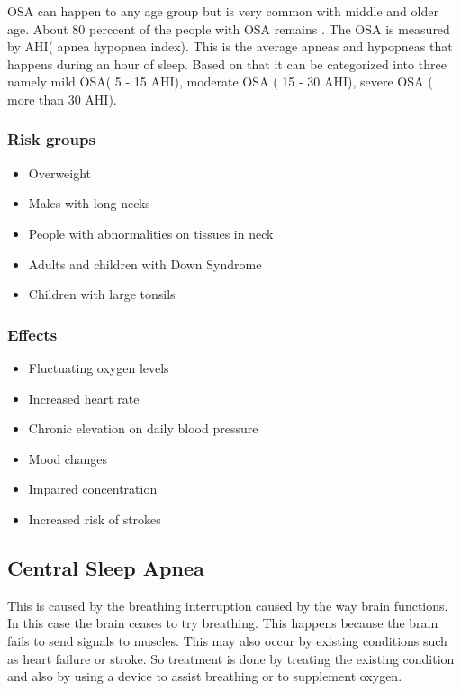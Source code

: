 \documentclass{report}
\begin{document}
        OSA can happen to any age group but is very common with middle and older age. About 80 perccent of the people with OSA remains . The OSA is measured by AHI( apnea hypopnea index). This is the average apneas and hypopneas that happens during an hour of sleep. Based on that it can be categorized into three namely mild OSA( 5 - 15 AHI), moderate OSA ( 15 - 30 AHI),  severe OSA ( more than 30 AHI).\\
\clearpage    
    \subsubsection{Risk groups}
    \begin{itemize}
    \item Overweight
    \item Males with long necks
    \item People with abnormalities on tissues in neck
    \item Adults and children with Down Syndrome
    \item Children with large tonsils
    \end{itemize}
    
    \subsubsection{Effects}
    
    \begin{itemize}
        \item Fluctuating oxygen levels
        \item Increased heart rate
        \item Chronic elevation on daily blood pressure
        \item Mood changes
        \item Impaired concentration
        \item Increased risk of strokes 
    \end{itemize}
    
    
\subsection{Central Sleep Apnea}   

This is caused by the breathing interruption caused by the way brain functions. In this case the brain ceases to try breathing. This happens because the brain fails to send signals to muscles. This may also occur by existing conditions such as heart failure or stroke. So treatment is done by treating the existing condition and also by using a device to assist breathing or to supplement oxygen.
\end{document}
